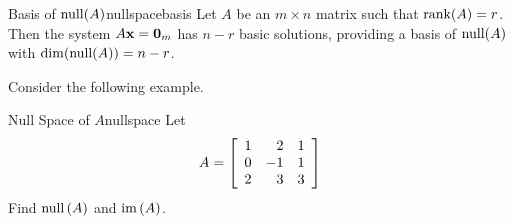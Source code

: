 \begin{theorem}{Basis of $\mbox{null}(A)$}{nullspacebasis}
Let $A$ be an $m \times n$ matrix such that $\mbox{rank}(A) = r$. Then the system $A{\bf x}={\bf 0}_m$ has $n-r$ basic solutions, providing a basis of $\mbox{null}(A)$ with $\dim(\mbox{null}(A))=n-r$.
\end{theorem}

Consider the following example. 

\begin{example}{Null Space of $A$}{nullspace}
Let
\begin{equation*}
A=\left[
\begin{array}{rrr}
1 & 2 & 1 \\
0 & -1 & 1 \\
2 & 3 & 3
\end{array}
\right] 
\end{equation*}
Find $\mbox{null} \left( A\right) $ and $\mbox{im}\left( A\right)$.
\end{example}

